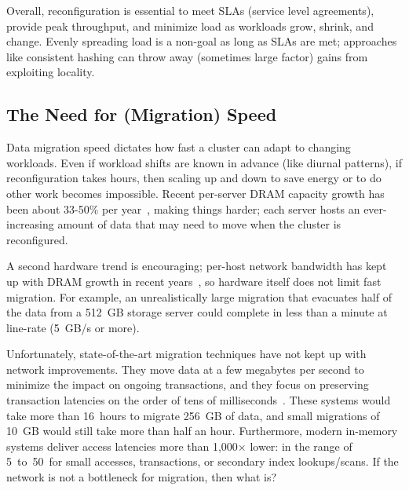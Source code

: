 Overall, reconfiguration is essential to meet SLAs (service level agreements), provide peak throughput,
and minimize load as workloads grow, shrink, and change. Evenly spreading load
is a non-goal as long as SLAs are met; approaches like consistent
hashing can throw away (sometimes large factor) gains from exploiting locality.

\subsection{The Need for (Migration) Speed}

Data migration speed dictates how fast a cluster can adapt to changing
workloads.  Even if workload shifts are known in advance (like
diurnal patterns), if reconfiguration takes hours, then scaling up and down to
save energy or to do other work becomes impossible.
Recent per-server DRAM capacity growth has been about 33-50\%
per year~\cite{computer-architecture}, making things harder; each server
hosts an ever-increasing amount of
data that may need to move when the cluster is reconfigured.


A second hardware trend is encouraging; per-host network bandwidth has kept up
with DRAM growth in recent years~\cite{ethernet}, so hardware
itself does not limit fast migration.  For example, an unrealistically large
migration that evacuates half of the data from a 512~GB storage server could
complete in less than a minute at line-rate (5~GB/s or more).


Unfortunately, state-of-the-art migration techniques have not kept up
with network improvements. They move data at a few megabytes per second
to minimize the impact on ongoing transactions, and they focus on preserving
transaction latencies on the order of tens of milliseconds~\cite{squall}.
These systems would take more than 16~hours to
migrate 256~GB of data, and small migrations of 10~GB would still take
more than half an hour. Furthermore, modern in-memory systems deliver access
latencies more than 1,000$\times$ lower: in the range of 5~to~50~\us for small
accesses, transactions, or secondary index lookups/scans. If the network
is not a
bottleneck for migration, then what is?


